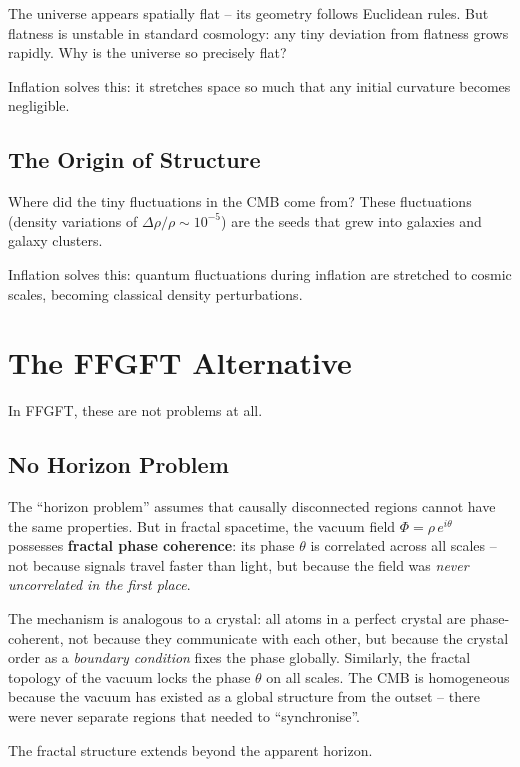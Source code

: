 The universe appears spatially flat -- its geometry follows Euclidean rules. But flatness is unstable in standard cosmology: any tiny deviation from flatness grows rapidly. Why is the universe so precisely flat?

Inflation solves this: it stretches space so much that any initial curvature becomes negligible.

\subsection{The Origin of Structure}

Where did the tiny fluctuations in the CMB come from? These fluctuations (density variations of $\Delta\rho/\rho \sim 10^{-5}$) are the seeds that grew into galaxies and galaxy clusters.

Inflation solves this: quantum fluctuations during inflation are stretched to cosmic scales, becoming classical density perturbations.

\section{The FFGFT Alternative}

In FFGFT, these are not problems at all.

\subsection{No Horizon Problem}

The ``horizon problem'' assumes that causally disconnected regions cannot have the same properties. But in fractal spacetime, the vacuum field $\Phi = \rho\, e^{i\theta}$ possesses \textbf{fractal phase coherence}: its phase $\theta$ is correlated across all scales -- not because signals travel faster than light, but because the field was \textit{never uncorrelated in the first place}.

The mechanism is analogous to a crystal: all atoms in a perfect crystal are phase-coherent, not because they communicate with each other, but because the crystal order as a \textit{boundary condition} fixes the phase globally. Similarly, the fractal topology of the vacuum locks the phase $\theta$ on all scales. The CMB is homogeneous because the vacuum has existed as a global structure from the outset -- there were never separate regions that needed to ``synchronise''.

The fractal structure extends beyond the apparent horizon.

